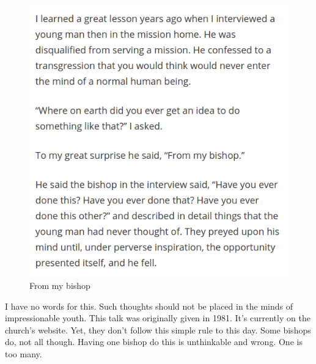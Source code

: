 \begin{figure}[h!]
  \centering
  \includegraphics[width=1\linewidth]{2018/images/bishop.png}
  \caption{From my bishop}
  \label{fig:clayton3}
\end{figure}

I have no words for this. Such thoughts should not be placed in the minds of
impressionable youth. This talk was originally given in 1981. It's currently on the
church's website. Yet, they don't follow this simple rule to this day. Some bishops
do, not all though. Having one bishop do this is unthinkable and wrong. One is too
many.
